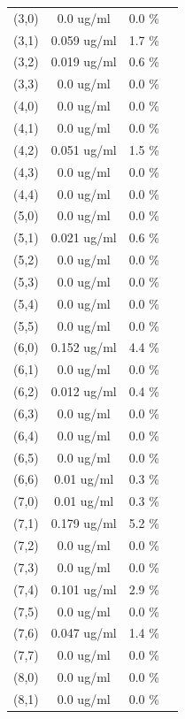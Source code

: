 \documentclass{article}
\begin{document}
\begin{tabular}{c c c c}
(3,0)&        0.0 ug/ml        &0.0 \%\\
(3,1)&        0.059 ug/ml        &1.7 \%\\
(3,2)&        0.019 ug/ml        &0.6 \%\\
(3,3)&        0.0 ug/ml        &0.0 \%\\
(4,0)&        0.0 ug/ml        &0.0 \%\\
(4,1)&        0.0 ug/ml        &0.0 \%\\
(4,2)&        0.051 ug/ml        &1.5 \%\\
(4,3)&        0.0 ug/ml        &0.0 \%\\
(4,4)&        0.0 ug/ml        &0.0 \%\\
(5,0)&        0.0 ug/ml        &0.0 \%\\
(5,1)&        0.021 ug/ml        &0.6 \%\\
(5,2)&        0.0 ug/ml        &0.0 \%\\
(5,3)&        0.0 ug/ml        &0.0 \%\\
(5,4)&        0.0 ug/ml        &0.0 \%\\
(5,5)&        0.0 ug/ml        &0.0 \%\\
(6,0)&        0.152 ug/ml        &4.4 \%\\
(6,1)&        0.0 ug/ml        &0.0 \%\\
(6,2)&        0.012 ug/ml        &0.4 \%\\
(6,3)&        0.0 ug/ml        &0.0 \%\\
(6,4)&        0.0 ug/ml        &0.0 \%\\
(6,5)&        0.0 ug/ml        &0.0 \%\\
(6,6)&        0.01 ug/ml        &0.3 \%\\
(7,0)&        0.01 ug/ml        &0.3 \%\\
(7,1)&        0.179 ug/ml        &5.2 \%\\
(7,2)&        0.0 ug/ml        &0.0 \%\\
(7,3)&        0.0 ug/ml        &0.0 \%\\
(7,4)&        0.101 ug/ml        &2.9 \%\\
(7,5)&        0.0 ug/ml        &0.0 \%\\
(7,6)&        0.047 ug/ml        &1.4 \%\\
(7,7)&        0.0 ug/ml        &0.0 \%\\
(8,0)&        0.0 ug/ml        &0.0 \%\\
(8,1)&        0.0 ug/ml        &0.0 \%\\

\end{tabular}
\end{document}
